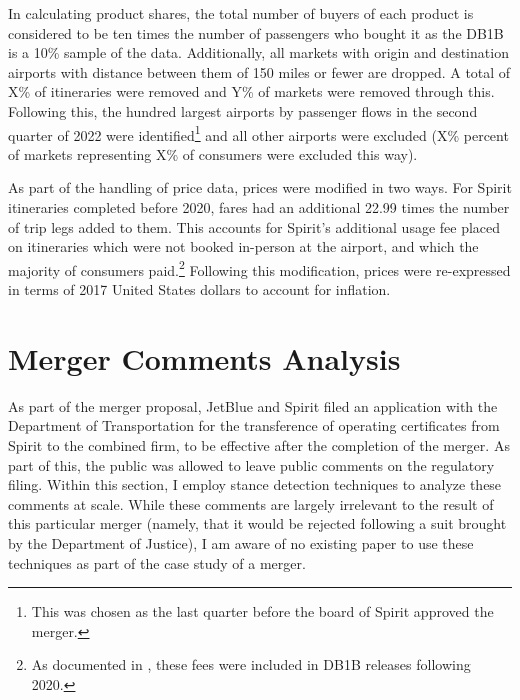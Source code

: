 \documentclass{article}
\begin{document}
\begin{appendices}
	In calculating product shares, the total number of buyers of each product is considered to be ten times the number of passengers who bought it as the DB1B is a 10\% sample of the data. Additionally, all markets with origin and destination airports with distance between them of 150 miles or fewer are dropped.  A total of {X}\% of itineraries were removed and Y\% of markets were removed through this. Following this, the hundred largest airports by passenger flows in the second quarter of 2022 were identified\footnote{This was chosen as the last quarter before the board of Spirit approved the merger.} and all other airports were excluded (X\% percent of markets representing X\% of consumers were excluded this way). 
	
	
	As part of the handling of price data, prices were modified in two ways. For Spirit itineraries completed before 2020, fares had an additional 22.99 times the number of trip legs added to them. This accounts for Spirit's additional usage fee placed on itineraries which were not booked in-person at the airport, and which the majority of consumers paid.\footnote{As documented in \citet{shrago_spirit_2024}, these fees were included in DB1B releases following 2020.} Following this modification, prices were re-expressed in terms of 2017 United States dollars to account for inflation.

    \FloatBarrier
	\section{Merger Comments Analysis}
	\label{sec:NaturalLanguage}

As part of the merger proposal, JetBlue and Spirit filed an application with the Department of Transportation for the transference of operating certificates from Spirit to the combined firm, to be effective after the completion of the merger. As part of this, the public was allowed to leave public comments on the regulatory filing. Within this section, I employ stance detection techniques to analyze these comments at scale. While these comments are largely irrelevant to the result of this particular merger (namely, that it would be rejected following a suit brought by the Department of Justice), I am aware of no existing paper to use these techniques as part of the case study of a merger. 


\end{appendices}
\end{document}
